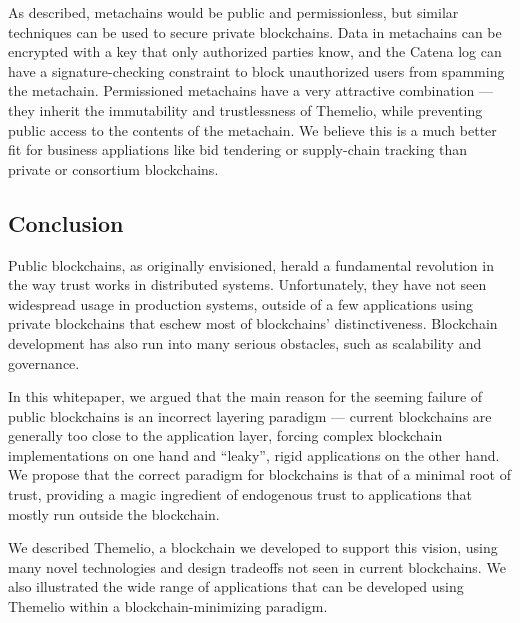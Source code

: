 \documentclass[]{article}
\begin{document}
As described, metachains would be public and permissionless, but similar
techniques can be used to secure private blockchains. Data in metachains
can be encrypted with a key that only authorized parties know, and the
Catena log can have a signature-checking constraint to block
unauthorized users from spamming the metachain. Permissioned metachains
have a very attractive combination --- they inherit the immutability and
trustlessness of Themelio, while preventing public access to the
contents of the metachain. We believe this is a much better fit for
business appliations like bid tendering or supply-chain tracking than
private or consortium blockchains.

\hypertarget{conclusion}{%
\subsection{Conclusion}\label{conclusion}}

Public blockchains, as originally envisioned, herald a fundamental
revolution in the way trust works in distributed systems. Unfortunately,
they have not seen widespread usage in production systems, outside of a
few applications using private blockchains that eschew most of
blockchains' distinctiveness. Blockchain development has also run into
many serious obstacles, such as scalability and governance.

In this whitepaper, we argued that the main reason for the seeming
failure of public blockchains is an incorrect layering paradigm ---
current blockchains are generally too close to the application layer,
forcing complex blockchain implementations on one hand and ``leaky'',
rigid applications on the other hand. We propose that the correct
paradigm for blockchains is that of a minimal root of trust, providing a
magic ingredient of endogenous trust to applications that mostly run
outside the blockchain.

We described Themelio, a blockchain we developed to support this vision,
using many novel technologies and design tradeoffs not seen in current
blockchains. We also illustrated the wide range of applications that can
be developed using Themelio within a blockchain-minimizing paradigm.
\end{document}
